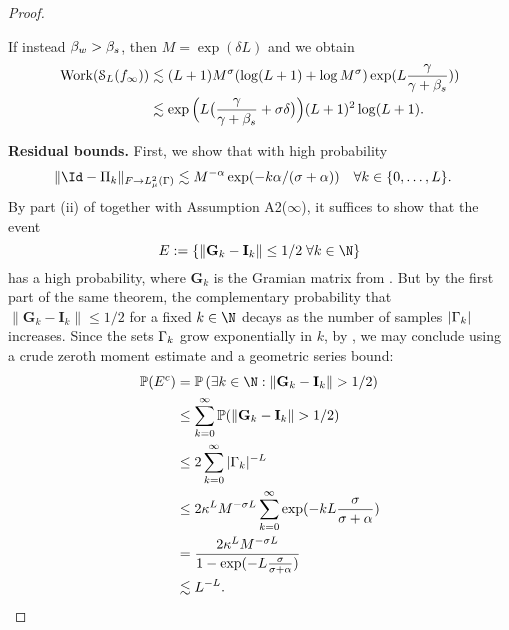 \begin{proof}
\begin{enumerate}[(a)]
	 If instead $\beta_{w}>\beta_{s}$, then $M=\exp(\delta L)$ and we obtain
		\begin{equation*}
		\begin{split}
		\text{Work}(\mathcal{S}_{L}(f_{\infty}))&\lesssim (L+1)M^{\sigma}(\log(L+1)+\log M^{\sigma})\exp(L\frac{\gamma}{\gamma+\beta_{s}}))\\
		&\lesssim \exp\Big(L\big(\frac{\gamma}{\gamma+\beta_{s}}+{\sigma}\delta\big)\Big)(L+1)^2\log(L+1).
				\end{split}
		\end{equation*}
	\end{enumerate}
\textbf{Residual bounds.} First, we show that with high probability 
	\begin{align}
	\label{eq:conv1}
	\|\Id-\P_k\|_{\F\to L^2_{\measure}(\domPS)}&\lesssim M^{-\alpha}\exp(-k\alpha /(\dimp+\alpha))\quad \forall k\in\{0,\dots,L\}.
	\end{align} 
By part (ii) of  together with Assumption A2($\infty$), it suffices to show that the event
\begin{equation*}
E:=\{\|{\mathbf{G}_k-\mathbf{I}_k}\|\leq 1/2 \;\forall k\in\N\}
\end{equation*}
has a high probability, where $\mathbf{G}_k$ is the Gramian matrix from . But by the first part of the same theorem, the complementary probability that $\|{\mathbf{G}_k-\mathbf{I}_k}\|\leq 1/2$ for a fixed $k\in\N$ decays as the number of samples $|\Gamma_{k}|$ increases. Since the sets $\Gamma_{k}$ grow exponentially in $k$, by ,  we may conclude using a crude zeroth moment estimate and a geometric series bound:
		\begin{equation}
		\label{eq:probbound}
		\begin{split}
		\prob(E^c)&=\prob\left(\exists k\in\N:\|{\mathbf{G}_k-\mathbf{I}_k}\|>1/2 \right)\\
		&\leq \sum_{k=0}^{\infty}\prob(\|{\mathbf{G}_k-\mathbf{I}_k}\|>1/2)\\
		&\leq 2\sum_{k=0}^\infty |\domPS_{k}|^{-L}\\
		&\leq 2\kappa^{L}M^{-\dimp L}\sum_{k=0}^{\infty}\exp(-kL\frac{\dimp}{\dimp+\alpha})\\
		&=\frac{2\kappa^{L}M^{-\dimp L}}{1-\exp(-L\frac{\dimp}{\dimp+\alpha})}\\
		&\lesssim L^{-L}.
		\end{split}
		\end{equation}
		

\end{proof}
